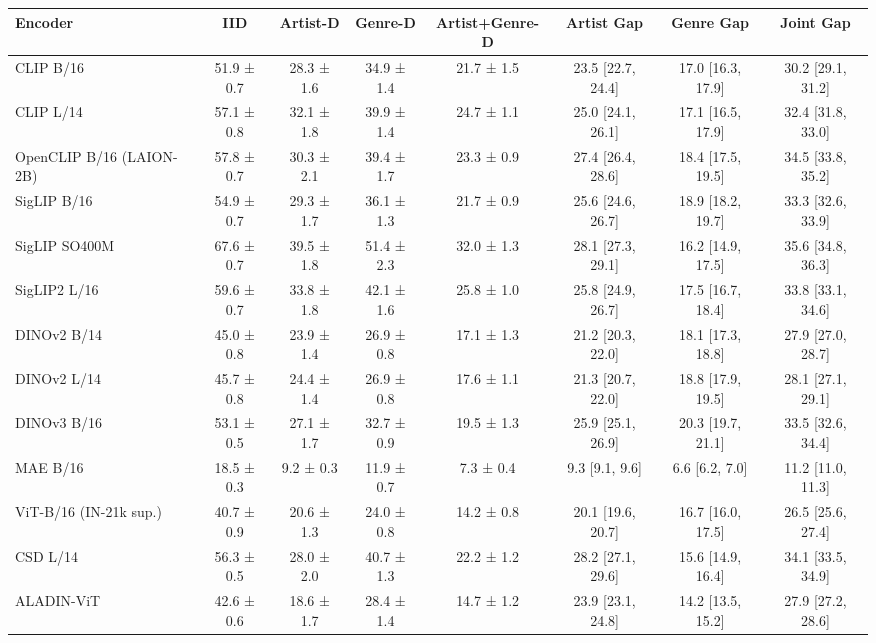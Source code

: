 \begin{tabular}{lccccccc}
\toprule
Encoder & IID & Artist-D & Genre-D & Artist+Genre-D & Artist Gap & Genre Gap & Joint Gap \\
\midrule
CLIP B/16 & 51.9 ± 0.7 & 28.3 ± 1.6 & 34.9 ± 1.4 & 21.7 ± 1.5 & 23.5 [22.7, 24.4] & 17.0 [16.3, 17.9] & 30.2 [29.1, 31.2] \\
CLIP L/14 & 57.1 ± 0.8 & 32.1 ± 1.8 & 39.9 ± 1.4 & 24.7 ± 1.1 & 25.0 [24.1, 26.1] & 17.1 [16.5, 17.9] & 32.4 [31.8, 33.0] \\
OpenCLIP B/16 (LAION-2B) & 57.8 ± 0.7 & 30.3 ± 2.1 & 39.4 ± 1.7 & 23.3 ± 0.9 & 27.4 [26.4, 28.6] & 18.4 [17.5, 19.5] & 34.5 [33.8, 35.2] \\
SigLIP B/16 & 54.9 ± 0.7 & 29.3 ± 1.7 & 36.1 ± 1.3 & 21.7 ± 0.9 & 25.6 [24.6, 26.7] & 18.9 [18.2, 19.7] & 33.3 [32.6, 33.9] \\
SigLIP SO400M & 67.6 ± 0.7 & 39.5 ± 1.8 & 51.4 ± 2.3 & 32.0 ± 1.3 & 28.1 [27.3, 29.1] & 16.2 [14.9, 17.5] & 35.6 [34.8, 36.3] \\
SigLIP2 L/16 & 59.6 ± 0.7 & 33.8 ± 1.8 & 42.1 ± 1.6 & 25.8 ± 1.0 & 25.8 [24.9, 26.7] & 17.5 [16.7, 18.4] & 33.8 [33.1, 34.6] \\
DINOv2 B/14 & 45.0 ± 0.8 & 23.9 ± 1.4 & 26.9 ± 0.8 & 17.1 ± 1.3 & 21.2 [20.3, 22.0] & 18.1 [17.3, 18.8] & 27.9 [27.0, 28.7] \\
DINOv2 L/14 & 45.7 ± 0.8 & 24.4 ± 1.4 & 26.9 ± 0.8 & 17.6 ± 1.1 & 21.3 [20.7, 22.0] & 18.8 [17.9, 19.5] & 28.1 [27.1, 29.1] \\
DINOv3 B/16 & 53.1 ± 0.5 & 27.1 ± 1.7 & 32.7 ± 0.9 & 19.5 ± 1.3 & 25.9 [25.1, 26.9] & 20.3 [19.7, 21.1] & 33.5 [32.6, 34.4] \\
MAE B/16 & 18.5 ± 0.3 & 9.2 ± 0.3 & 11.9 ± 0.7 & 7.3 ± 0.4 & 9.3 [9.1, 9.6] & 6.6 [6.2, 7.0] & 11.2 [11.0, 11.3] \\
ViT-B/16 (IN-21k sup.) & 40.7 ± 0.9 & 20.6 ± 1.3 & 24.0 ± 0.8 & 14.2 ± 0.8 & 20.1 [19.6, 20.7] & 16.7 [16.0, 17.5] & 26.5 [25.6, 27.4] \\
CSD L/14 & 56.3 ± 0.5 & 28.0 ± 2.0 & 40.7 ± 1.3 & 22.2 ± 1.2 & 28.2 [27.1, 29.6] & 15.6 [14.9, 16.4] & 34.1 [33.5, 34.9] \\
ALADIN-ViT & 42.6 ± 0.6 & 18.6 ± 1.7 & 28.4 ± 1.4 & 14.7 ± 1.2 & 23.9 [23.1, 24.8] & 14.2 [13.5, 15.2] & 27.9 [27.2, 28.6] \\
\bottomrule
\end{tabular}

